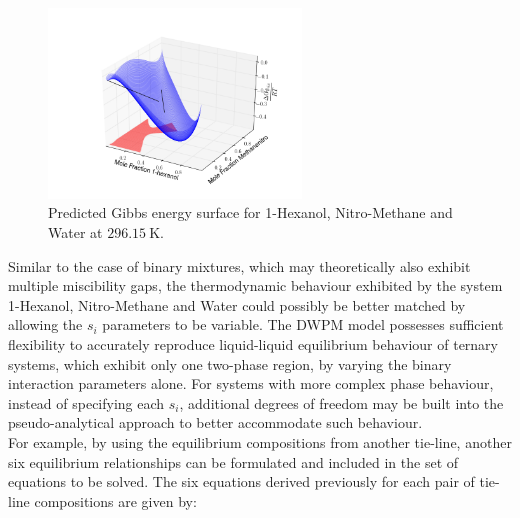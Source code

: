 \begin{figure}[hp]
\centering
\includegraphics[width = 0.6\textwidth, bb=100 0 500 400]{Results_Parts/TernaryParams/1-hexanol-methanenitro-water/DWPM/296.15/PredictedGibbsWireframe.png}
\caption{Predicted Gibbs energy surface for 1-Hexanol, Nitro-Methane and Water at $296.15~\mathrm{K}$.}
\label{1-hexanol-methanenitro-waterGibbsSurface2}
\end{figure}
\clearpage

Similar to the case of binary mixtures, which may theoretically also exhibit multiple miscibility gaps, the thermodynamic behaviour exhibited by the system 1-Hexanol, Nitro-Methane and Water could possibly be better matched by allowing the $s_{i}$ parameters to be variable. The DWPM model possesses sufficient flexibility to accurately reproduce liquid-liquid equilibrium behaviour of ternary systems, which exhibit only one two-phase region, by varying the binary interaction parameters alone. For systems with more complex phase behaviour, instead of specifying each $s_{i}$, additional degrees of freedom may be built into the pseudo-analytical approach to better accommodate such behaviour.\\

For example, by using the equilibrium compositions from another tie-line, another six equilibrium relationships can be formulated and included in the set of equations to be solved. The six equations derived previously for each pair of tie-line compositions are given by:\

